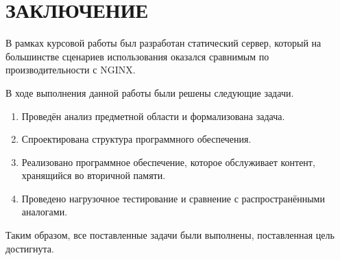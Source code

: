 \section*{ЗАКЛЮЧЕНИЕ}


В рамках курсовой работы был разработан статический сервер, который на большинстве сценариев использования оказался сравнимым по производительности с NGINX.

В ходе выполнения данной работы были решены следующие задачи.

\begin{enumerate}[label*=\arabic*.]
	\item Проведён анализ предметной области и формализована задача.
	\item Спроектирована структура программного обеспечения.
	\item Реализовано программное обеспечение, которое обслуживает контент, хранящийся во вторичной памяти. 
	\item Проведено нагрузочное тестирование и сравнение с распространёнными аналогами.
\end{enumerate}

Таким образом, все поставленные задачи были выполнены, поставленная цель достигнута.

\pagebreak